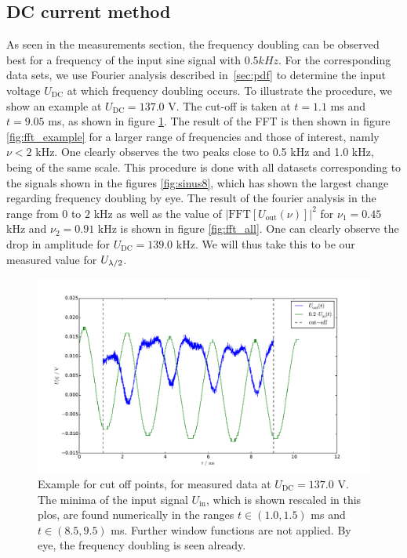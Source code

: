 \subsection{DC current method}
\label{ssub:DC current method}
As seen in the measurements section, the frequency doubling can be 
observed best for a frequency of the input sine signal with 
$0.5 kHz$. For the corresponding data sets, we use Fourier analysis 
described in~\ref{sec:pdf} to determine 
the input voltage $U_\mathrm{DC}$ at which frequency doubling occurs. 
To illustrate the procedure, we show an example at $U_\mathrm{DC} = 137.0$ V.
The cut-off is taken at $t = 1.1$ ms and $t = 9.05$ ms, as shown in figure 
\ref{fig:cut_off_example}. The result of the FFT is then shown in figure 
\ref{fig:fft_example} for a larger range of frequencies and those of interest, 
namly $\nu < 2$ kHz. One clearly observes the two peaks close to 
0.5 kHz and 1.0 kHz, being of the same scale. This procedure is 
done with all datasets corresponding to the signals shown in 
the figures \ref{fig:sinus8}, which has shown the largest 
change regarding frequency doubling by eye. The result of the fourier 
analysis in the range from $0$ to $2$ kHz as well as the 
value of $|\mathrm{FFT}\left[U_\mathrm{out} \left(\nu\right)\right]|^2$ for 
$\nu_1 = 0.45$ kHz and $\nu_2 = 0.91$ kHz 
is shown in figure \ref{fig:fft_all}.
One can clearly observe the drop in amplitude for $U_\mathrm{DC} = 139.0$ kHz. 
We will thus take this to be our measured value for $U_{\lambda/2}$.
\begin{figure}
\includegraphics[width=\textwidth]{figures/cut_off_example.pdf}
\caption{
    Example for cut off points, for measured data at 
    $U_\mathrm{DC} = 137.0$ V. The minima of the input 
    signal $U_\mathrm{in}$, which is shown rescaled in this plos, 
    are found numerically in the ranges 
    $t \in (1.0, 1.5)$ ms and $t \in (8.5, 9.5)$ ms. 
    Further window functions are not applied. 
    By eye, the frequency doubling is seen already. 
    }
\label{fig:cut_off_example}
\end{figure}

